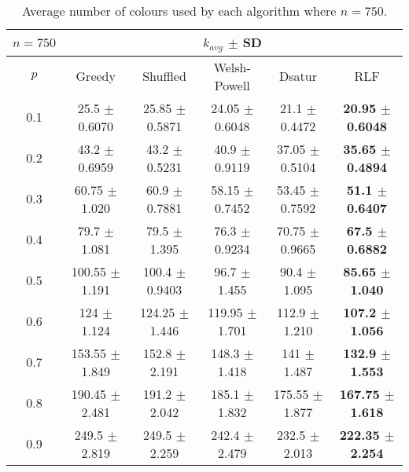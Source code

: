 \begin{table}[H]
    \centering
    \begin{tabular}{cccccc}
        
        $n = 750$& \multicolumn{5}{c}{$k_{avg}$ $\pm$ SD} \\
        \hline
        $p$ & Greedy & Shuffled & Welsh-Powell & Dsatur & RLF \\
        \hline
    0.1 & 25.5 $\pm$ 0.6070 & 25.85 $\pm$ 0.5871 & 24.05 $\pm$ 0.6048 & 21.1 $\pm$ 0.4472 & \textbf{20.95 $\pm$ 0.6048} \\
        0.2 & 43.2 $\pm$ 0.6959 & 43.2 $\pm$ 0.5231 & 40.9 $\pm$ 0.9119 & 37.05 $\pm$ 0.5104 & \textbf{35.65 $\pm$ 0.4894} \\
        0.3 & 60.75 $\pm$ 1.020 & 60.9 $\pm$ 0.7881 & 58.15 $\pm$ 0.7452 & 53.45 $\pm$ 0.7592 & \textbf{51.1 $\pm$ 0.6407} \\
        0.4 & 79.7 $\pm$ 1.081 & 79.5 $\pm$ 1.395 & 76.3 $\pm$ 0.9234 & 70.75 $\pm$ 0.9665 & \textbf{67.5 $\pm$ 0.6882} \\
        0.5 & 100.55 $\pm$ 1.191 & 100.4 $\pm$ 0.9403 & 96.7 $\pm$ 1.455 & 90.4 $\pm$ 1.095 & \textbf{85.65 $\pm$ 1.040} \\
        0.6 & 124 $\pm$ 1.124 & 124.25 $\pm$ 1.446 & 119.95 $\pm$ 1.701 & 112.9 $\pm$ 1.210 & \textbf{107.2 $\pm$ 1.056} \\
        0.7 & 153.55 $\pm$ 1.849 & 152.8 $\pm$ 2.191 & 148.3 $\pm$ 1.418 & 141 $\pm$ 1.487 & \textbf{132.9 $\pm$ 1.553} \\
        0.8 & 190.45 $\pm$ 2.481 & 191.2 $\pm$ 2.042 & 185.1 $\pm$ 1.832 & 175.55 $\pm$ 1.877 & \textbf{167.75 $\pm$ 1.618} \\
        0.9 & 249.5 $\pm$ 2.819 & 249.5 $\pm$ 2.259 & 242.4 $\pm$ 2.479 & 232.5 $\pm$ 2.013 & \textbf{222.35 $\pm$ 2.254} \\
        \hline
    \end{tabular}
    \caption{Average number of colours used by each algorithm where $n = 750$.}
    \label{tab:avgKforV750}
\end{table}

